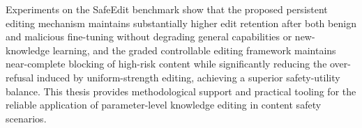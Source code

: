 \begin{eabstract}
Experiments on the SafeEdit benchmark show that the proposed persistent editing mechanism maintains substantially higher edit retention after both benign and malicious fine-tuning without degrading general capabilities or new-knowledge learning, and the graded controllable editing framework maintains near-complete blocking of high-risk content while significantly reducing the over-refusal induced by uniform-strength editing, achieving a superior safety-utility balance. This thesis provides methodological support and practical tooling for the reliable application of parameter-level knowledge editing in content safety scenarios.

\end{eabstract}
